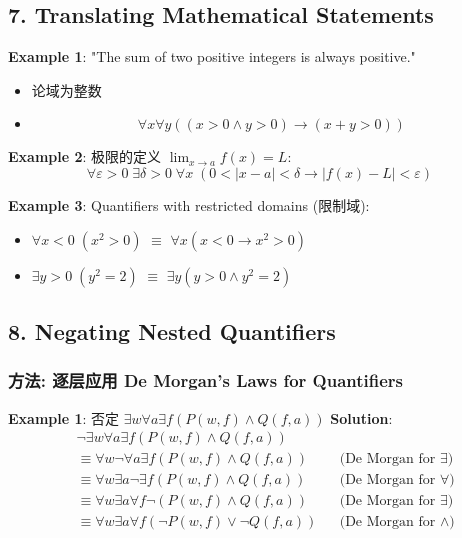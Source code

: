 \documentclass[10pt,a4paper,openany]{ctexbook}
\theoremstyle{definition}
\theoremstyle{remark}
\begin{document}
\vspace{-2pt}

\subsection{7. Translating Mathematical Statements}

\textbf{Example 1}: "The sum of two positive integers is always positive."
\begin{itemize}
\item 论域为整数
\item $$\forall x \forall y ((x > 0 \land y > 0) \to (x + y > 0))$$

\end{itemize}

\textbf{Example 2}: 极限的定义 $\displaystyle \lim_{x \to a} f(x) = L$:
\[
\forall \varepsilon > 0 \; \exists \delta > 0 \; \forall x \; (0 < |x - a| < \delta \to |f(x) - L| < \varepsilon)
\]

\textbf{Example 3}: Quantifiers with restricted domains (限制域):
\begin{itemize}
\item $\forall x < 0 \; (x^2 > 0)$ $\equiv$ $\forall x (x < 0 \to x^2 > 0)$
\item $\exists y > 0 \; (y^2 = 2)$ $\equiv$ $\exists y (y > 0 \land y^2 = 2)$

\end{itemize}

\vspace{-2pt}

\subsection{8. Negating Nested Quantifiers}

\subsubsection{方法: 逐层应用 De Morgan's Laws for Quantifiers}

\textbf{Example 1}: 否定 $\exists w \forall a \exists f (P(w,f) \land Q(f,a))$
\textbf{Solution}:
\[
\begin{aligned}
&\neg \exists w \forall a \exists f (P(w,f) \land Q(f,a)) \\
&\equiv \forall w \neg \forall a \exists f (P(w,f) \land Q(f,a)) &&\text{(De Morgan for } \exists) \\
&\equiv \forall w \exists a \neg \exists f (P(w,f) \land Q(f,a)) &&\text{(De Morgan for } \forall) \\
&\equiv \forall w \exists a \forall f \neg (P(w,f) \land Q(f,a)) &&\text{(De Morgan for } \exists) \\
&\equiv \forall w \exists a \forall f (\neg P(w,f) \lor \neg Q(f,a)) &&\text{(De Morgan for } \land)
\end{aligned}
\]
\end{document}
